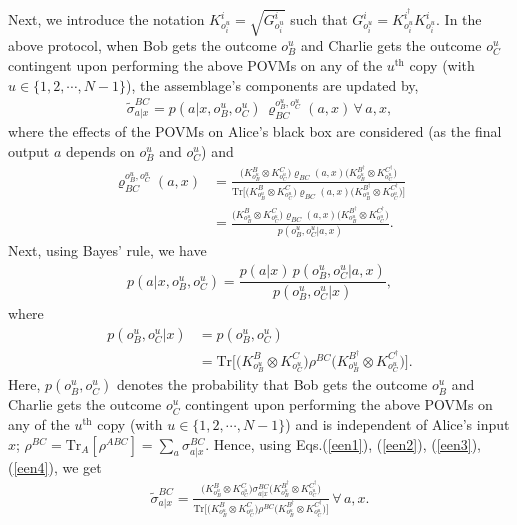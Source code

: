 \documentclass[reprint,superscriptaddress,nofootinbib,amsmath,amssymb,aps,pra,longbibliography]{revtex4-1}
\begin{document}
Next, we introduce the notation $K_{o^u_i}^{i} = \sqrt{G_{o^u_i}^{i}}$ such that $G_{o^u_i}^{i} = K_{o^u_i}^{i^{\dagger}} K_{o^u_i}^{i}$. In the above protocol, when Bob gets the outcome $o^u_B$ and Charlie gets the outcome $o^u_C$ contingent upon performing the above POVMs on any of the $u^{\text{th}}$ copy (with $u \in \{1, 2, \cdots, N-1\}$), the assemblage’s components are updated by,
\begin{align}
    \widetilde{\sigma}_{a|x}^{BC} = p(a|x, o^u_B, o^u_C) \, \varrho_{BC}^{o^u_B, o^u_C}(a, x) \, \forall \, a,x,
    \label{een1}
\end{align}
where the effects of the POVMs on Alice’s black box are considered (as the final output $a$ depends on $o^u_B$ and $o^u_C$) and
\begin{align}
 \varrho_{BC}^{o^u_B, o^u_C}(a, x) &=    \frac{\Big(K_{o^u_B}^{B} \otimes K_{o^u_C}^{C}\Big) \varrho_{BC}(a, x) \Big(K_{o^u_B}^{B^{\dagger}} \otimes K_{o^u_C}^{C^{\dagger}} \Big)}{\text{Tr} \Big[ \Big(K_{o^u_B}^{B} \otimes K_{o^u_C}^{C} \Big) \varrho_{BC}(a, x) \Big(K_{o^u_B}^{B^{\dagger}} \otimes K_{o^u_C}^{C^{\dagger}} \Big) \Big]} \nonumber \\
 &=    \frac{\Big(K_{o^u_B}^{B} \otimes K_{o^u_C}^{C}\Big) \varrho_{BC}(a, x) \Big(K_{o^u_B}^{B^{\dagger}} \otimes K_{o^u_C}^{C^{\dagger}} \Big)}{p(o^u_B, o^u_C|a,x)}.
 \label{een2}
\end{align}
Next, using Bayes' rule, we have 
\begin{align}
 p(a|x, o^u_B, o^u_C) = \dfrac{p(a|x) \, p(o^u_B, o^u_C|a,x)}{p(o^u_B, o^u_C|x)}  , 
 \label{een3}
\end{align}
where
\begin{align}
 p(o^u_B, o^u_C|x) &= p(o^u_B, o^u_C) \nonumber \\
 &= \text{Tr} \Big[ \Big(K_{o^u_B}^{B} \otimes K_{o^u_C}^{C} \Big) \rho^{BC} \Big(K_{o^u_B}^{B^{\dagger}} \otimes K_{o^u_C}^{C^{\dagger}} \Big) \Big].
 \label{een4}
\end{align}
Here, $p(o^u_B, o^u_C)$ denotes the probability that Bob gets the outcome $o^u_B$ and Charlie gets the outcome $o^u_C$ contingent upon performing the above POVMs on any of the $u^{\text{th}}$ copy (with $u \in \{1, 2, \cdots, N-1\}$) and is independent of Alice's input $x$; $\rho^{BC} = \text{Tr}_{A}[\rho^{ABC}] = \sum_{a} \sigma_{a|x}^{BC} $. Hence, using Eqs.(\ref{een1}), (\ref{een2}), (\ref{een3}), (\ref{een4}), we get
\begin{align}
    \widetilde{\sigma}_{a|x}^{BC} = \frac{\Big(K_{o^u_B}^{B} \otimes K_{o^u_C}^{C}\Big) \sigma_{a|x}^{BC} \Big(K_{o^u_B}^{B^{\dagger}} \otimes K_{o^u_C}^{C^{\dagger}} \Big)}{\text{Tr} \Big[ \Big(K_{o^u_B}^{B} \otimes K_{o^u_C}^{C} \Big) \rho^{BC} \Big(K_{o^u_B}^{B^{\dagger}} \otimes K_{o^u_C}^{C^{\dagger}} \Big) \Big]} \, \forall \, a,x.
    \label{finalass1}
\end{align}
\end{document}
